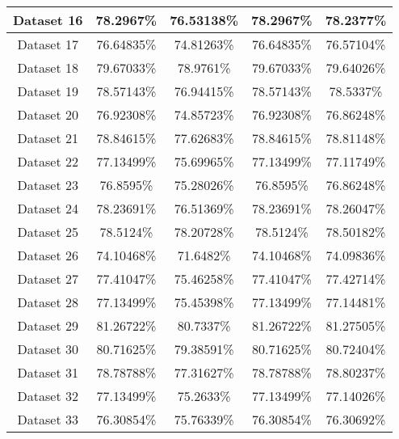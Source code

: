 \begin{table}
\begin{tabular}{ |c||c|c|c|c| }
    Dataset 16 & 78.2967\% & 76.53138\% & 78.2967\% & 78.2377\%\\
    \hline
    Dataset 17 & 76.64835\% & 74.81263\% & 76.64835\% & 76.57104\%\\
    \hline
    Dataset 18 & 79.67033\% & 78.9761\% & 79.67033\% & 79.64026\%\\
    \hline
    Dataset 19 & 78.57143\% & 76.94415\% & 78.57143\% & 78.5337\%\\
    \hline
    Dataset 20 & 76.92308\% & 74.85723\% & 76.92308\% & 76.86248\%\\
    \hline
    Dataset 21 & 78.84615\% & 77.62683\% & 78.84615\% & 78.81148\%\\
    \hline
    Dataset 22 & 77.13499\% & 75.69965\% & 77.13499\% & 77.11749\%\\
    \hline
    Dataset 23 & 76.8595\% & 75.28026\% & 76.8595\% & 76.86248\%\\
    \hline
    Dataset 24 & 78.23691\% & 76.51369\% & 78.23691\% & 78.26047\%\\
    \hline
    Dataset 25 & 78.5124\% & 78.20728\% & 78.5124\% & 78.50182\%\\
    \hline
    Dataset 26 & 74.10468\% & 71.6482\% & 74.10468\% & 74.09836\%\\
    \hline
    Dataset 27 & 77.41047\% & 75.46258\% & 77.41047\% & 77.42714\%\\
    \hline
    Dataset 28 & 77.13499\% & 75.45398\% & 77.13499\% & 77.14481\%\\
    \hline
    Dataset 29 & 81.26722\% & 80.7337\% & 81.26722\% & 81.27505\%\\
    \hline
    Dataset 30 & 80.71625\% & 79.38591\% & 80.71625\% & 80.72404\%\\
    \hline
    Dataset 31 & 78.78788\% & 77.31627\% & 78.78788\% & 78.80237\%\\
    \hline
    Dataset 32 & 77.13499\% & 75.2633\% & 77.13499\% & 77.14026\%\\
    \hline
    Dataset 33 & 76.30854\% & 75.76339\% & 76.30854\% & 76.30692\%\\
    \hline
\end{tabular}
\end{table}

\newpage

